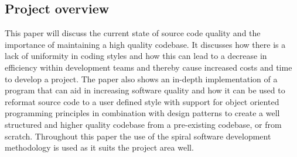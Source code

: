 \subsection{Project overview}
This paper will discuss the current state of source code quality and the importance of maintaining a high quality codebase. It discusses how there is a lack of uniformity in coding styles and how this can lead to a decrease in efficiency within development teams and thereby cause increased costs and time to develop a project.
The paper also shows an in-depth implementation of a program that can aid in increasing software quality and how it can be used to reformat source code to a user defined style with support for object oriented programming principles in combination with design patterns to create a well structured and higher quality codebase from a pre-existing codebase, or from scratch.
Throughout this paper the use of the spiral software development methodology is used as it suits the project area well.

